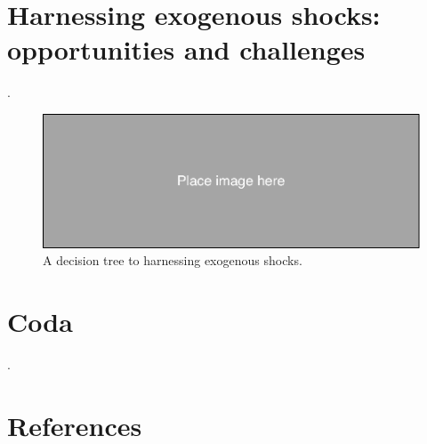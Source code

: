 \begin{refsection}
\section{Harnessing exogenous shocks: opportunities and challenges}
\label{sec:how_exogenous_shocks_differ}

.



\begin{figure}[!htbp]
  \includegraphics[width=1\textwidth]{exhibits/place_holder.pdf}
  \caption{A decision tree to harnessing exogenous shocks.}
  \label{fig:harnessing_exogeneous_shocks}
\end{figure}

\section{Coda}
\label{sec:coda}
.

\clearpage

%
\section*{References}
\printbibliography[heading=none]
\end{refsection}

%
%
%
%
%
%

